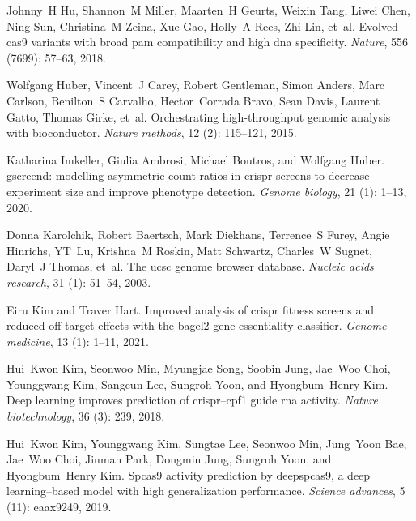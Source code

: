 \documentclass[pdftex,english,10pt]{article}
\begin{document}
{\begin{thebibliography}{105}
Johnny~H Hu, Shannon~M Miller, Maarten~H Geurts, Weixin Tang, Liwei Chen, Ning
  Sun, Christina~M Zeina, Xue Gao, Holly~A Rees, Zhi Lin, et~al.
\newblock Evolved cas9 variants with broad pam compatibility and high dna
  specificity.
\newblock \emph{Nature}, 556 (7699): 57--63, 2018.

Wolfgang Huber, Vincent~J Carey, Robert Gentleman, Simon Anders, Marc Carlson,
  Benilton~S Carvalho, Hector~Corrada Bravo, Sean Davis, Laurent Gatto, Thomas
  Girke, et~al.
\newblock Orchestrating high-throughput genomic analysis with bioconductor.
\newblock \emph{Nature methods}, 12 (2): 115--121, 2015.

Katharina Imkeller, Giulia Ambrosi, Michael Boutros, and Wolfgang Huber.
\newblock gscreend: modelling asymmetric count ratios in crispr screens to
  decrease experiment size and improve phenotype detection.
\newblock \emph{Genome biology}, 21 (1): 1--13, 2020.

Donna Karolchik, Robert Baertsch, Mark Diekhans, Terrence~S Furey, Angie
  Hinrichs, YT~Lu, Krishna~M Roskin, Matt Schwartz, Charles~W Sugnet, Daryl~J
  Thomas, et~al.
\newblock The ucsc genome browser database.
\newblock \emph{Nucleic acids research}, 31 (1): 51--54,
  2003.

Eiru Kim and Traver Hart.
\newblock Improved analysis of crispr fitness screens and reduced off-target
  effects with the bagel2 gene essentiality classifier.
\newblock \emph{Genome medicine}, 13 (1): 1--11, 2021.

Hui~Kwon Kim, Seonwoo Min, Myungjae Song, Soobin Jung, Jae~Woo Choi, Younggwang
  Kim, Sangeun Lee, Sungroh Yoon, and Hyongbum~Henry Kim.
\newblock Deep learning improves prediction of crispr--cpf1 guide rna activity.
\newblock \emph{Nature biotechnology}, 36 (3): 239, 2018.

Hui~Kwon Kim, Younggwang Kim, Sungtae Lee, Seonwoo Min, Jung~Yoon Bae, Jae~Woo
  Choi, Jinman Park, Dongmin Jung, Sungroh Yoon, and Hyongbum~Henry Kim.
\newblock Spcas9 activity prediction by deepspcas9, a deep learning--based
  model with high generalization performance.
\newblock \emph{Science advances}, 5 (11): eaax9249, 2019.


\end{thebibliography}}
\end{document}
